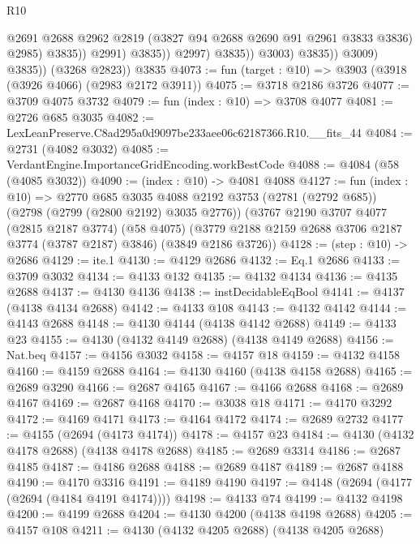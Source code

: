 \begin{lexlean}{R10}
\begin{coremodule}
                                    @2691
                                    @2688
                                    @2962
                                    @2819
                                    (@3827 @94 @2688 @2690 @91 @2961 @3833 @3836)
                                    @2985)
                                  @3835))
                              @2991)
                            @3835))
                        @2997)
                      @3835))
                  @3003)
                @3835))
            @3009)
          @3835))
      (@3268 @2823))
    @3835
@4073 := fun (target : @10) => @3903 (@3918 (@3926 @4066) (@2983 @2172 @3911))
@4075 := @3718 @2186 @3726
@4077 := @3709 @4075 @3732
@4079 := fun (index : @10) => @3708 @4077
@4081 := @2726 @685 @3035
@4082 := LexLeanPreserve.C8ad295a0d9097be233aee06c62187366.R10.__fits_44
@4084 := @2731 (@4082 @3032)
@4085 := VerdantEngine.ImportanceGridEncoding.workBestCode
@4088 := @4084 (@58 (@4085 @3032))
@4090 := (index : @10) -> @4081 @4088
@4127 := fun (index : @10) =>
  @2770
    @685
    @3035
    @4088
    @2192
    @3753
    (@2781 (@2792 @685))
    (@2798 (@2799 (@2800 @2192) @3035 @2776))
    (@3767
      @2190
      @3707
      @4077
      (@2815 @2187 @3774)
      (@58 @4075)
      (@3779 @2188 @2159 @2688 @3706 @2187 @3774 (@3787 @2187) @3846)
      (@3849 @2186 @3726))
@4128 := (step : @10) -> @2686
@4129 := ite.{1}
@4130 := @4129 @2686
@4132 := Eq.{1} @2686
@4133 := @3709 @3032
@4134 := @4133 @132
@4135 := @4132 @4134
@4136 := @4135 @2688
@4137 := @4130 @4136
@4138 := instDecidableEqBool
@4141 := @4137 (@4138 @4134 @2688)
@4142 := @4133 @108
@4143 := @4132 @4142
@4144 := @4143 @2688
@4148 := @4130 @4144 (@4138 @4142 @2688)
@4149 := @4133 @23
@4155 := @4130 (@4132 @4149 @2688) (@4138 @4149 @2688)
@4156 := Nat.beq
@4157 := @4156 @3032
@4158 := @4157 @18
@4159 := @4132 @4158
@4160 := @4159 @2688
@4164 := @4130 @4160 (@4138 @4158 @2688)
@4165 := @2689 @3290
@4166 := @2687 @4165
@4167 := @4166 @2688
@4168 := @2689 @4167
@4169 := @2687 @4168
@4170 := @3038 @18
@4171 := @4170 @3292
@4172 := @4169 @4171
@4173 := @4164 @4172
@4174 := @2689 @2732
@4177 := @4155 (@2694 (@4173 @4174))
@4178 := @4157 @23
@4184 := @4130 (@4132 @4178 @2688) (@4138 @4178 @2688)
@4185 := @2689 @3314
@4186 := @2687 @4185
@4187 := @4186 @2688
@4188 := @2689 @4187
@4189 := @2687 @4188
@4190 := @4170 @3316
@4191 := @4189 @4190
@4197 := @4148 (@2694 (@4177 (@2694 (@4184 @4191 @4174))))
@4198 := @4133 @74
@4199 := @4132 @4198
@4200 := @4199 @2688
@4204 := @4130 @4200 (@4138 @4198 @2688)
@4205 := @4157 @108
@4211 := @4130 (@4132 @4205 @2688) (@4138 @4205 @2688)

\end{coremodule}
\end{lexlean}
